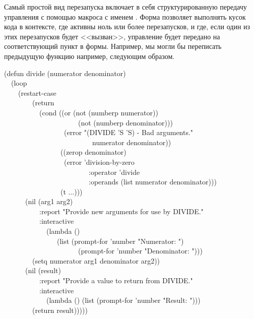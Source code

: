 Самый простой вид перезапуска включает в себя структурированную передачу
управления с помощью макроса с именем . Форма
 позволяет выполнять кусок кода в контексте, где активны ноль
или более перезапусков, и где, если один из этих перезапусков будет <<вызван>>,
управление будет передано на соответствующий пункт в 
формы. Например, мы могли бы переписать предыдущую функцию 
например, следующим образом.
\begin{lisp}
(defun divide (numerator denominator) \\
~~(loop \\
~~~~(restart-case \\
~~~~~~~~(return \\
~~~~~~~~~~(cond ((or (not (numberp numerator)) \\
~~~~~~~~~~~~~~~~~~~~~(not (numberp denominator))) \\
~~~~~~~~~~~~~~~~~(error "(DIVIDE '{\Xtilde}S '{\Xtilde}S) - Bad arguments." \\
~~~~~~~~~~~~~~~~~~~~~~~~~numerator denominator)) \\
~~~~~~~~~~~~~~~~((zerop denominator) \\
~~~~~~~~~~~~~~~~~(error 'division-by-zero \\
~~~~~~~~~~~~~~~~~~~~~~~~:operator 'divide \\
~~~~~~~~~~~~~~~~~~~~~~~~:operands (list numerator denominator))) \\
~~~~~~~~~~~~~~~~(t ...))) \\
~~~~~~(nil (arg1 arg2) \\
~~~~~~~~~~:report "Provide new arguments for use by DIVIDE." \\
~~~~~~~~~~:interactive \\
~~~~~~~~~~~~(lambda () \\
~~~~~~~~~~~~~~~(list (prompt-for 'number "Numerator: ") \\
~~~~~~~~~~~~~~~~~~~~~(prompt-for 'number "Denominator: "))) \\
~~~~~~~~(setq numerator arg1 denominator arg2)) \\
~~~~~~(nil (result) \\
~~~~~~~~~~:report "Provide a value to return from DIVIDE." \\
~~~~~~~~~~:interactive \\
~~~~~~~~~~~~(lambda () (list (prompt-for 'number "Result: "))) \\
~~~~~~~~(return result)))))
\end{lisp}

